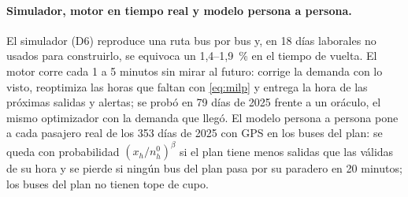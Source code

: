 \paragraph{Simulador, motor en tiempo real y modelo persona a persona.}
El simulador (D6) reproduce una ruta bus por bus y, en 18 días laborales no usados para construirlo, se equivoca un
1,4--1,9~\% en el tiempo de vuelta. El motor corre cada 1 a 5 minutos sin mirar al futuro: corrige la demanda con lo
visto, reoptimiza las horas que faltan con \eqref{eq:milp} y entrega la hora de las próximas salidas y alertas; se probó
en 79 días de 2025 frente a un oráculo, el mismo optimizador con la demanda que llegó. El modelo persona a persona
pone a cada pasajero real de los 353 días de 2025 con GPS en los buses del plan: se queda con probabilidad
$(x_h/n^0_h)^{\beta}$ si el plan tiene menos salidas que las válidas de su hora y se pierde si ningún bus del plan pasa
por su paradero en 20 minutos; los buses del plan no tienen tope de cupo.
